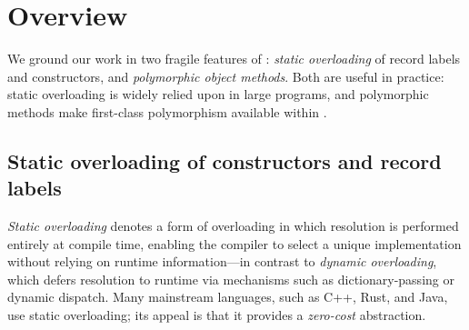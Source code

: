 \documentclass[acmsmall,screen,nonacm%
\Anonymous{,anonymous}{}%
\Final{}{,review}%
]{acmart}
\begin{document}
\section{Overview}
\label{sec/overview}

We ground our work in two fragile features of \OCaml: \emph{static overloading}
of record labels and constructors, and \emph{polymorphic object methods}. Both
are useful in practice: static overloading is widely relied upon in large
programs, and polymorphic methods make first-class polymorphism available
within \OCaml.

\subsection{Static overloading of constructors and record labels}
\label{sec/overview/overloading}


\emph{Static overloading} denotes a form of overloading in which resolution is
performed entirely at compile time, enabling the compiler to select a unique
implementation without relying on runtime information---in contrast to
\emph{dynamic overloading}, which defers resolution to runtime via mechanisms
such as dictionary-passing or dynamic dispatch. Many mainstream languages, such
as C++, Rust, and Java, use static overloading; its appeal is that it provides
a \emph{zero-cost} abstraction.

\end{document}
